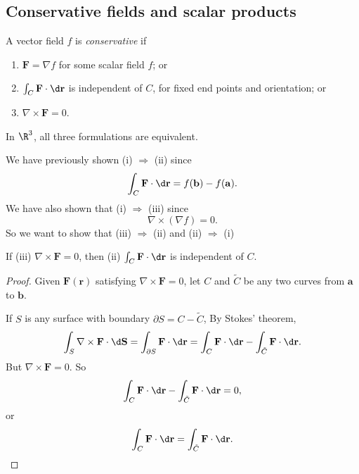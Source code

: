 \documentclass[a4paper]{article}
\begin{document}
\subsection{Conservative fields and scalar products}
\begin{defi}
  A vector field $f$ is \emph{conservative} if
  \begin{enumerate}
    \item $\mathbf{F} = \nabla f$ for some scalar field $f$; or
    \item $\int_C \mathbf{F}\cdot \d \mathbf{r}$ is independent of $C$, for fixed end points and orientation; or
    \item $\nabla \times \mathbf{F} = 0$.
  \end{enumerate}
  In $\R^3$, all three formulations are equivalent.
\end{defi}

We have previously shown (i) $\Rightarrow$ (ii) since
\[
  \int_C \mathbf{F}\cdot \d \mathbf{r} = f(\mathbf{b}) - f(\mathbf{a}).
\]
We have also shown that (i) $\Rightarrow$ (iii) since
\[
  \nabla \times (\nabla f) = 0.
\]
So we want to show that (iii) $\Rightarrow $ (ii) and (ii) $\Rightarrow $ (i)
\begin{prop}
  If (iii) $\nabla\times \mathbf{F}= 0 $, then (ii) $\int_C \mathbf{F}\cdot \d \mathbf{r}$ is independent of $C$.
\end{prop}

\begin{proof}
  Given $\mathbf{F}(\mathbf{r})$ satisfying $\nabla\times \mathbf{F} = 0$, let $C$ and $\tilde C$ be any two curves from $\mathbf{a}$ to $\mathbf{b}$.
  \begin{center}
  \end{center}
  If $S$ is any surface with boundary $\partial S = C - \tilde C$, By Stokes' theorem,
  \[
    \int_{S}\nabla \times \mathbf{F}\cdot \d \mathbf{S} = \int_{\partial S}\mathbf{F}\cdot \d \mathbf{r} = \int_C \mathbf{F}\cdot \d \mathbf{r} - \int_{\tilde{C}}\mathbf{F}\cdot \d \mathbf{r}.
  \]
  But $\nabla\times \mathbf{F} = 0$. So
  \[
    \int_C \mathbf{F}\cdot \d \mathbf{r} - \int_{\tilde{C}} \mathbf{F}\cdot \d \mathbf{r} = 0,
  \]
  or
  \[
    \int_C \mathbf{F}\cdot \d \mathbf{r} = \int_{\tilde{C}}\mathbf{F}\cdot \d \mathbf{r}.
  \]
\end{proof}
\end{document}
